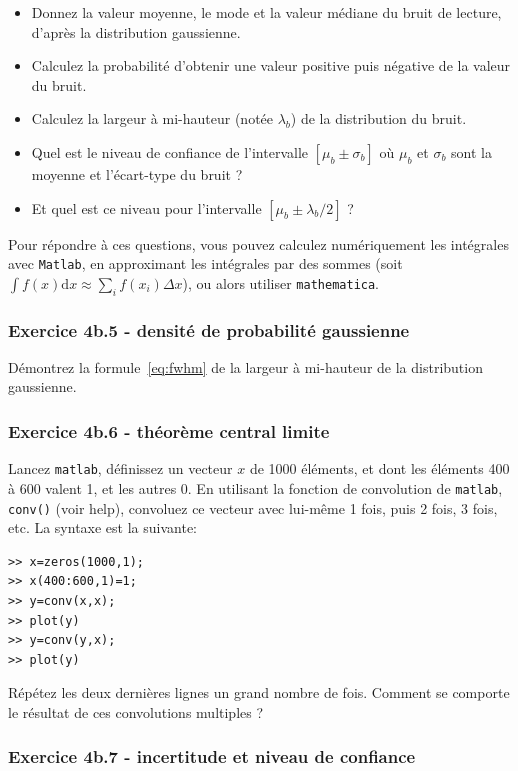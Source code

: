 \documentclass[main.tex]{subfiles}
\begin{document}
\begin{itemize}
    \item Donnez la valeur moyenne, le mode et la valeur médiane du bruit de lecture, d'après la distribution gaussienne.
    \item Calculez la probabilité d'obtenir une valeur positive puis négative de la valeur du bruit.
    \item Calculez la largeur à mi-hauteur (notée $\lambda_b$) de la distribution du bruit.
    \item Quel est le niveau de confiance de l'intervalle $[\mu_b\pm\sigma_b]$ où $\mu_b$ et $\sigma_b$ sont la moyenne et l'écart-type du bruit ?
    \item Et quel est ce niveau pour l'intervalle $[\mu_b\pm\lambda_b/2]$ ?
\end{itemize}
Pour répondre à ces questions, vous pouvez calculez numériquement les intégrales avec \texttt{Matlab}, en approximant les intégrales par des sommes (soit $\int f(x)\text{d}x\approx\sum_if(x_i)\Delta x$), ou alors utiliser \texttt{mathematica}.

\subsubsection*{Exercice 4b.5 - densité de probabilité gaussienne}

Démontrez la formule~\ref{eq:fwhm} de la largeur à mi-hauteur de la distribution gaussienne.

\subsubsection*{Exercice 4b.6 - théorème central limite}

Lancez \texttt{matlab}, définissez un vecteur $x$ de 1000 éléments, et dont les éléments 400 à 600 valent 1, et les autres 0. En utilisant la fonction de convolution de \texttt{matlab}, \texttt{conv()} (voir help), convoluez ce vecteur avec lui-même 1 fois, puis 2 fois, 3 fois, etc. La syntaxe est la suivante:
\begin{verbatim}
>> x=zeros(1000,1);
>> x(400:600,1)=1;
>> y=conv(x,x);
>> plot(y)
>> y=conv(y,x);
>> plot(y)
\end{verbatim}
Répétez les deux dernières lignes un grand nombre de fois. Comment se comporte le résultat de ces convolutions multiples ?

\newpage
\subsubsection*{Exercice 4b.7 - incertitude et niveau de confiance}
\end{document}
